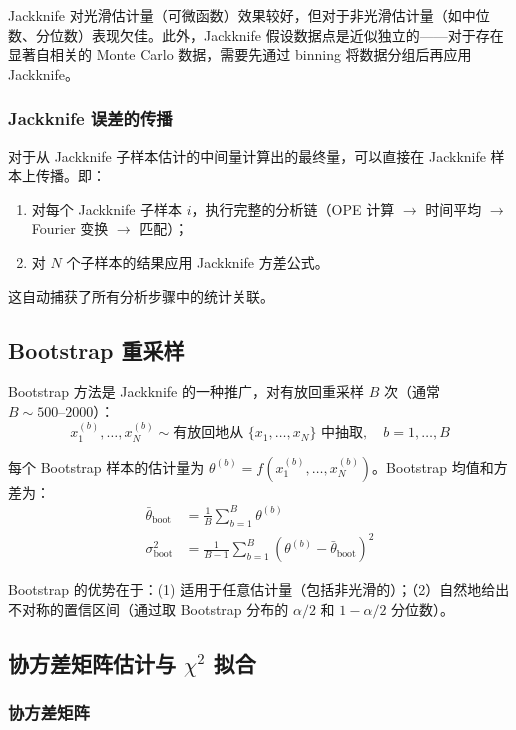 \documentclass[11pt,a4paper]{ctexart}
\begin{document}
Jackknife 对光滑估计量（可微函数）效果较好，但对于非光滑估计量（如中位数、分位数）表现欠佳。此外，Jackknife 假设数据点是近似独立的——对于存在显著自相关的 Monte Carlo 数据，需要先通过 binning 将数据分组后再应用 Jackknife。

\subsubsection{Jackknife 误差的传播}

对于从 Jackknife 子样本估计的中间量计算出的最终量，可以直接在 Jackknife 样本上传播。即：
\begin{enumerate}
  \item 对每个 Jackknife 子样本 $i$，执行完整的分析链（OPE 计算 $\to$ 时间平均 $\to$ Fourier 变换 $\to$ 匹配）；
  \item 对 $N$ 个子样本的结果应用 Jackknife 方差公式。
\end{enumerate}
这自动捕获了所有分析步骤中的统计关联。

\subsection{Bootstrap 重采样}

Bootstrap 方法是 Jackknife 的一种推广，对有放回重采样 $B$ 次（通常 $B \sim 500\text{--}2000$）：
\begin{equation}
x_1^{(b)}, \ldots, x_N^{(b)} \sim \text{有放回地从 } \{x_1,\ldots,x_N\} \text{ 中抽取}, \quad b = 1,\ldots,B
\end{equation}

每个 Bootstrap 样本的估计量为 $\theta^{(b)} = f(x_1^{(b)}, \ldots, x_N^{(b)})$。Bootstrap 均值和方差为：
\begin{align}
\bar{\theta}_{\text{boot}} &= \frac{1}{B} \sum_{b=1}^{B} \theta^{(b)} \\
\sigma_{\text{boot}}^2 &= \frac{1}{B-1} \sum_{b=1}^{B} (\theta^{(b)} - \bar{\theta}_{\text{boot}})^2
\end{align}

Bootstrap 的优势在于：(1) 适用于任意估计量（包括非光滑的）；（2）自然地给出不对称的置信区间（通过取 Bootstrap 分布的 $\alpha/2$ 和 $1-\alpha/2$ 分位数）。

\subsection{协方差矩阵估计与 $\chi^2$ 拟合}

\subsubsection{协方差矩阵}
\end{document}
